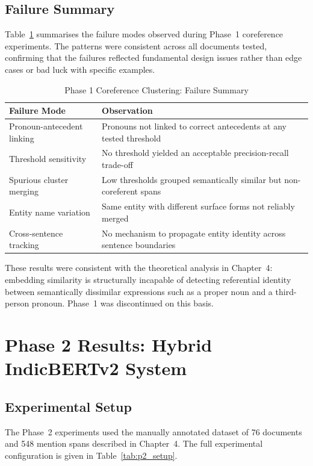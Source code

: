 \documentclass[12pt,a4paper]{report}
\begin{document}
\subsection{Failure Summary}

Table~\ref{tab:p1_failure} summarises the failure modes observed during Phase~1 coreference experiments. The patterns were consistent across all documents tested, confirming that the failures reflected fundamental design issues rather than edge cases or bad luck with specific examples.

\begin{table}[H]
\centering
\caption{Phase 1 Coreference Clustering: Failure Summary}
\label{tab:p1_failure}
\begin{tabular}{|l|p{7.5cm}|}
\hline
\textbf{Failure Mode} & \textbf{Observation} \\
\hline
Pronoun-antecedent linking & Pronouns not linked to correct antecedents at any tested threshold \\
Threshold sensitivity & No threshold yielded an acceptable precision-recall trade-off \\
Spurious cluster merging & Low thresholds grouped semantically similar but non-coreferent spans \\
Entity name variation & Same entity with different surface forms not reliably merged \\
Cross-sentence tracking & No mechanism to propagate entity identity across sentence boundaries \\
\hline
\end{tabular}
\end{table}

\noindent These results were consistent with the theoretical analysis in Chapter~4: embedding similarity is structurally incapable of detecting referential identity between semantically dissimilar expressions such as a proper noun and a third-person pronoun. Phase~1 was discontinued on this basis.

\section{Phase 2 Results: Hybrid IndicBERTv2 System}

\subsection{Experimental Setup}

The Phase~2 experiments used the manually annotated dataset of 76 documents and 548 mention spans described in Chapter~4. The full experimental configuration is given in Table~\ref{tab:p2_setup}.
\end{document}
